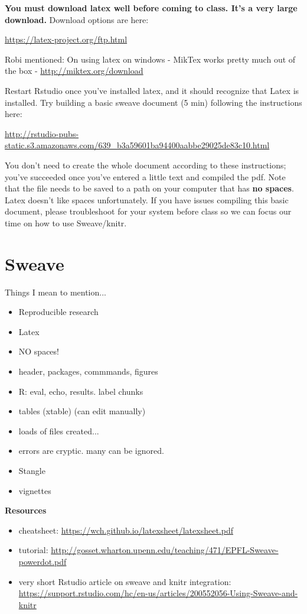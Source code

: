 \documentclass{article}
\begin{document}


\textbf{You must download latex well before coming to class. It's a very large download.} Download options are here: 

\url{https://latex-project.org/ftp.html}

Robi mentioned:
On using latex on windows - MikTex works pretty much out of the box - \url{http://miktex.org/download}

Restart Rstudio once you've installed latex, and it should recognize that Latex is installed. Try building a basic sweave document (5 min) following the instructions here:

\url{http://rstudio-pubs-static.s3.amazonaws.com/639_b3a59601ba94400aabbe29025de83c10.html}

You don't need to create the whole document according to these instructions; you've succeeded once you've entered a little text and compiled the pdf. Note that the file needs to be saved to a path on your computer that has \textbf{no spaces}. Latex doesn't like spaces unfortunately. If you have issues compiling this basic document, please troubleshoot for your system before class so we can focus our time on how to use Sweave/knitr.

\section{Sweave}

Things I mean to mention...

\begin{itemize}
  \item Reproducible research
  \item Latex
  \item NO spaces!
  \item header, packages, commmands, figures
  \item R: eval, echo, results. label chunks
  \item tables (xtable) (can edit manually)
  \item loads of files created...
  \item errors are cryptic. many can be ignored.
  \item Stangle
  \item vignettes
\end{itemize}

\textbf{Resources}
\begin{itemize}
  \item cheatsheet: \url{https://wch.github.io/latexsheet/latexsheet.pdf}
  \item tutorial: \url{http://gosset.wharton.upenn.edu/teaching/471/EPFL-Sweave-powerdot.pdf}
  \item very short Rstudio article on sweave and knitr integration: \url{https://support.rstudio.com/hc/en-us/articles/200552056-Using-Sweave-and-knitr}
\end{itemize}
\end{document}
